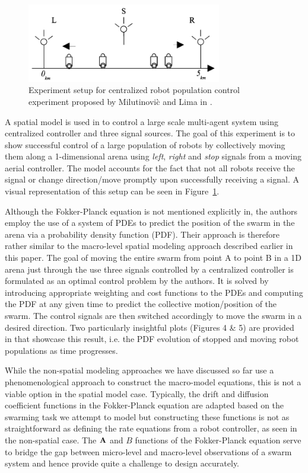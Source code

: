 \documentclass[Main.tex]{subfiles}
\begin{document}
\begin{figure}[!ht]
\centering\includegraphics[width=8.5cm]{assets/spatSignal.png}
\centering\caption{Experiment setup for centralized robot population control experiment proposed by Milutinovi\`{c} and Lima in%
.}\label{fig:signal}
\end{figure}

A spatial model is used in\cite{Milutinovi2006} to control a large scale multi-agent system using centralized controller and three signal sources. The goal of this experiment is to show successful control of a large population of robots by collectively moving them along a 1-dimensional arena using \emph{left}, \emph{right} and \emph{stop} signals from a moving aerial controller. The model accounts for the fact that not all robots receive the signal or change direction/move promptly upon successfully receiving a signal. A visual representation of this setup can be seen in Figure~\ref{fig:signal}.

Although the Fokker-Planck equation is not mentioned explicitly in\cite{Milutinovi2006}, the authors employ the use of a system of PDEs to predict the position of the swarm in the arena via a probability density function (PDF). Their approach is therefore rather similar to the macro-level spatial modeling approach described earlier in this paper. The goal of moving the entire swarm  from point A to point B in a 1D arena just through the use three signals controlled by a centralized controller is formulated as an optimal control problem by the authors. It is solved by introducing appropriate weighting and cost functions to the PDEs and computing the PDF at any given time to predict the collective motion/position of the swarm. The control signals are then switched accordingly to move the swarm in a desired direction. Two particularly insightful plots (Figures 4 \& 5) are provided in\cite{Milutinovi2006} that showcase this result, i.e. the PDF evolution of stopped and moving robot populations as time progresses.

While the non-spatial modeling approaches we have discussed so far use a phenomenological approach to construct the macro-model equations, this is not a viable option in the spatial model case. Typically, the drift and diffusion coefficient functions in the Fokker-Planck equation are adapted based on the swarming task we attempt to model but constructing these functions is not as straightforward as defining the rate equations from a robot controller, as seen in the non-spatial case. The $\mathbf{A}$ and $B$ functions of the Fokker-Planck equation serve to bridge the gap between micro-level and macro-level observations of a swarm system and hence provide quite a challenge to design accurately.
\end{document}
